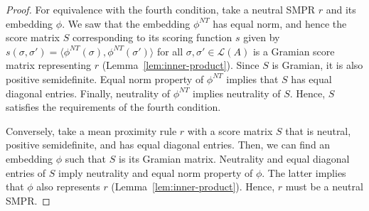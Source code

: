 \documentclass[prodmode,acmec]{ec-acmsmall}
\newcommand{\calL}{{\mathcal{L}}}
\newcommand{\rank}{{\calL(A)}}
\newcommand{\nt}{NT}
\begin{document}
\begin{proof}
For equivalence with the fourth condition, take a neutral SMPR $r$ and its embedding $\phi$. We saw that the embedding $\phi^{\nt}$ has equal norm, and hence the score matrix $S$ corresponding to its scoring function $s$ given by $s(\sigma,\sigma') = \langle \phi^{\nt}(\sigma),\phi^{\nt}(\sigma')\rangle$ for all $\sigma,\sigma' \in \rank$ is a Gramian score matrix representing $r$ (Lemma~\ref{lem:inner-product}). Since $S$ is Gramian, it is also positive semidefinite. Equal norm property of $\phi^{\nt}$ implies that $S$ has equal diagonal entries. Finally, neutrality of $\phi^{\nt}$ implies neutrality of $S$. Hence, $S$ satisfies the requirements of the fourth condition. 

Conversely, take a mean proximity rule $r$ with a score matrix $S$ that is neutral, positive semidefinite, and has equal diagonal entries. Then, we can find an embedding $\phi$ such that $S$ is its Gramian matrix. Neutrality and equal diagonal entries of $S$ imply neutrality and equal norm property of $\phi$. The latter implies that $\phi$ also represents $r$ (Lemma~\ref{lem:inner-product}). Hence, $r$ must be a neutral SMPR. 
\end{proof}


\end{document}
